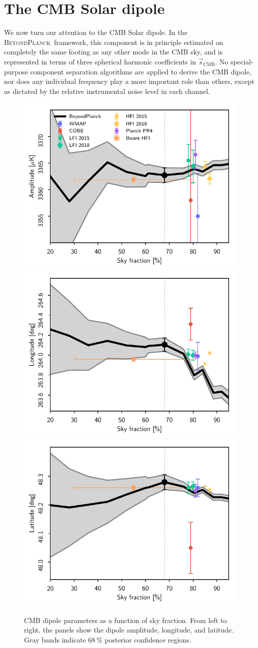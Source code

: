 \documentclass[twocolumn]{aa}
\newcommand{\s}[0]{\vec{s}}
\newcommand{\BP}{\textsc{BeyondPlanck}}
\begin{document}
\section{The CMB Solar dipole}
\label{sec:dipole}

We now turn our attention to the CMB Solar dipole. In the
\BP\ framework, this component is in principle estimated on completely
the same footing as any other mode in the CMB sky, and is represented
in terms of three spherical harmonic coefficients in
$\s_{\mathrm{CMB}}$. No special-purpose component separation
algorithms are applied to derive the CMB dipole, nor does any
individual frequency play a more important role than others, except as
dictated by the relative instrumental noise level in each channel.

\begin{figure}[t]
  \center
  \includegraphics[width=0.33\linewidth]{figs/cmb_dipole_amplitude.pdf}
  \includegraphics[width=0.33\linewidth]{figs/cmb_dipole_longitude.pdf}
  \includegraphics[width=0.33\linewidth]{figs/cmb_dipole_latitude.pdf}
  \caption{CMB dipole parameters as a function of sky fraction. %
    From left to right, the panels show the dipole amplitude, longitude, and latitude. Gray bands indicate 68\,\% posterior confidence regions.}\label{fig:cmb_dipole}
\end{figure}
\end{document}
